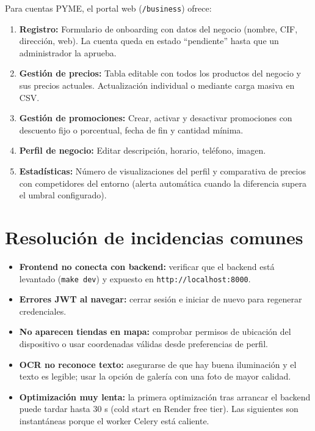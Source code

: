 Para cuentas PYME, el portal web (\texttt{/business}) ofrece:

\begin{enumerate}
  \item \textbf{Registro:} Formulario de onboarding con datos del negocio (nombre, CIF, direcci\'on,
    web). La cuenta queda en estado ``pendiente'' hasta que un administrador la aprueba.
  \item \textbf{Gesti\'on de precios:} Tabla editable con todos los productos del negocio y sus
    precios actuales. Actualizaci\'on individual o mediante carga masiva en CSV.
  \item \textbf{Gesti\'on de promociones:} Crear, activar y desactivar promociones con descuento
    fijo o porcentual, fecha de fin y cantidad m\'inima.
  \item \textbf{Perfil de negocio:} Editar descripci\'on, horario, tel\'efono, imagen.
  \item \textbf{Estad\'isticas:} N\'umero de visualizaciones del perfil y comparativa de precios
    con competidores del entorno (alerta autom\'atica cuando la diferencia supera el umbral
    configurado).
\end{enumerate}

\section{Resoluci\'on de incidencias comunes}\label{sec:manual-incidencias}

\begin{itemize}
  \item \textbf{Frontend no conecta con backend:} verificar que el backend est\'a levantado
    (\texttt{make dev}) y expuesto en \texttt{http://localhost:8000}.
  \item \textbf{Errores JWT al navegar:} cerrar sesi\'on e iniciar de nuevo para regenerar
    credenciales.
  \item \textbf{No aparecen tiendas en mapa:} comprobar permisos de ubicaci\'on del dispositivo
    o usar coordenadas v\'alidas desde preferencias de perfil.
  \item \textbf{OCR no reconoce texto:} asegurarse de que hay buena iluminaci\'on y el texto es
    legible; usar la opci\'on de galer\'ia con una foto de mayor calidad.
  \item \textbf{Optimizaci\'on muy lenta:} la primera optimizaci\'on tras arrancar el backend puede
    tardar hasta 30 s (cold start en Render free tier). Las siguientes son instant\'aneas porque
    el worker Celery est\'a caliente.
\end{itemize}
